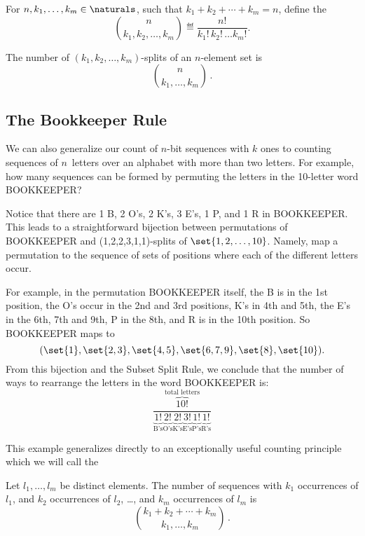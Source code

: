 \begin{definition}
For $n,k_1,\dots,k_m \in \naturals$, such that $k_1+k_2+\cdots+k_m = n$,
define the 
\[
\binom{n}{k_1, k_2, \dots, k_m} \eqdef \frac{n!}{k_1!\, k_2!\, \dots k_m!}.
\]
\end{definition}

\begin{rul}
The number of $(k_1,k_2, \dots, k_m)$-splits of an $n$-element set is
\[
\binom{n}{k_1,\dots,k_m}\,.
\]
\end{rul}


\subsection{The Bookkeeper Rule}

We can also generalize our count of $n$-bit sequences
with $k$ ones to counting sequences of $n$~letters over an alphabet
with more than two letters.  For example, how many sequences can be
formed by permuting the letters in the 10-letter word BOOKKEEPER?

Notice that there are 1 B, 2 O's, 2 K's, 3 E's, 1 P, and 1 R in
BOOKKEEPER.  This leads to a straightforward bijection between
permutations of BOOKKEEPER and (1,2,2,3,1,1)-splits of $\set{1, 2,
  \dots, 10}$.  Namely, map a permutation to the sequence of sets of
positions where each of the different letters occur.

For example, in the permutation BOOKKEEPER itself, the B is in the 1st
position, the O's occur in the 2nd and 3rd positions, K's in 4th and 5th,
the E's in the 6th, 7th and 9th, P in the 8th, and R is in the 10th
position. So BOOKKEEPER maps to
\[
(\set{1}, \set{2,3}, \set{4,5}, \set{6,7,9}, \set{8}, \set{10}).
\]
From this bijection and the Subset Split Rule, we conclude that the
number of ways to rearrange the letters in the word BOOKKEEPER is:
\[
\frac{\overbrace{10!}^{\text{total letters}}}{
\underbrace{1!}_{\text{B's}}
\underbrace{2!}_{\text{O's}}
\underbrace{2!}_{\text{K's}}
\underbrace{3!}_{\text{E's}}
\underbrace{1!}_{\text{P's}}
\underbrace{1!}_{\text{R's}}}
\]

This example generalizes directly to an exceptionally useful counting
principle which we will call the
\begin{rul}
Let $l_1, \ldots, l_m$ be distinct elements.  The number of sequences with
$k_1$ occurrences of $l_1$, and $k_2$ occurrences of $l_2$, \dots, and
$k_m$ occurrences of $l_m$ is
\[
\binom{k_1 + k_2 + \cdots + k_m}{k_1,\dots,k_m}\,.
\]
\end{rul}

